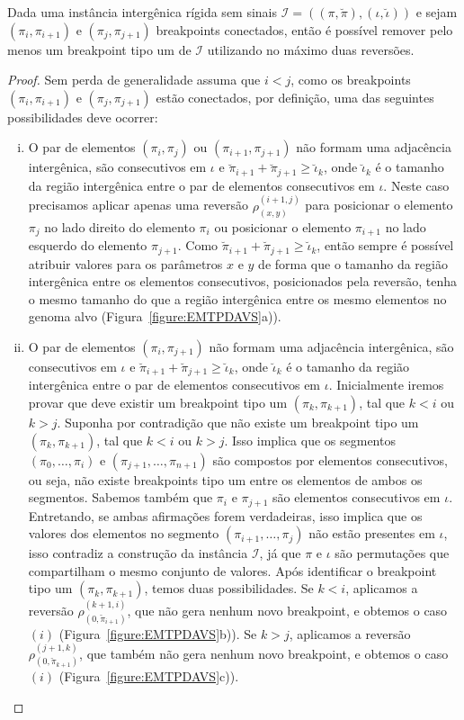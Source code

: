\begin{lemma}\label{lemma:IMYFBWDY}
Dada uma instância intergênica rígida sem sinais $\mathcal{I}=((\pi,\breve\pi),(\iota,\breve\iota))$ e sejam $(\pi_i,\pi_{i+1})$ e $(\pi_j,\pi_{j+1})$ breakpoints conectados, então é possível remover pelo menos um breakpoint tipo um de $\mathcal{I}$ utilizando no máximo duas reversões.
\end{lemma}
\begin{proof}
Sem perda de generalidade assuma que $i < j$, como os breakpoints $(\pi_i,\pi_{i+1})$ e $(\pi_j,\pi_{j+1})$ estão conectados, por definição, uma das seguintes possibilidades deve ocorrer:
\begin{enumerate}[i.]
    \item O par de elementos $(\pi_i,\pi_{j})$ ou $(\pi_{i+1},\pi_{j+1})$ não formam uma adjacência intergênica, são consecutivos em $\iota$ e $\breve\pi_{i+1} + \breve\pi_{j+1} \ge \breve\iota_k$, onde $\breve\iota_k$ é o tamanho da região intergênica entre o par de elementos consecutivos em $\iota$. Neste caso precisamos aplicar apenas uma reversão $\rho^{(i+1,j)}_{(x,y)}$ para posicionar o elemento $\pi_{j}$ no lado direito do elemento $\pi_{i}$ ou posicionar o elemento $\pi_{i+1}$ no lado esquerdo do elemento $\pi_{j+1}$. Como $\breve\pi_{i+1} + \breve\pi_{j+1} \ge \breve\iota_k$, então sempre é possível atribuir valores para os parâmetros $x$ e $y$ de forma que o tamanho da região intergênica entre os elementos consecutivos, posicionados pela reversão, tenha o mesmo tamanho do que a região intergênica entre os mesmo elementos no genoma alvo (Figura~\ref{figure:EMTPDAVS}a)).  
    \item O par  de elementos $(\pi_i,\pi_{j+1})$ não formam uma adjacência intergênica, são consecutivos em $\iota$ e $\breve\pi_{i+1} + \breve\pi_{j+1} \ge \breve\iota_k$, onde $\breve\iota_k$ é o tamanho da região intergênica entre o par de elementos consecutivos em $\iota$. Inicialmente iremos provar que deve existir um breakpoint tipo um $(\pi_k,\pi_{k+1})$, tal que $k < i$ ou $k > j$. Suponha por contradição que não existe um breakpoint tipo um $(\pi_k,\pi_{k+1})$, tal que $k < i$ ou $k > j$. Isso implica que os segmentos $(\pi_0,\dots,\pi_i)$ e $(\pi_{j+1},\dots,\pi_{n+1})$ são compostos por elementos consecutivos, ou seja, não existe breakpoints tipo um entre os elementos de ambos os segmentos. Sabemos também que $\pi_i$ e $\pi_{j+1}$ são elementos consecutivos em $\iota$. Entretando, se ambas afirmações forem verdadeiras, isso implica que os valores dos elementos no segmento $(\pi_{i+1},\dots,\pi_j)$ não estão presentes em $\iota$, isso contradiz a construção da instância $\mathcal{I}$, já que $\pi$ e $\iota$ são permutações que compartilham o mesmo conjunto de valores. Após identificar o breakpoint tipo um $(\pi_k,\pi_{k+1})$, temos duas possibilidades. Se $k < i$, aplicamos a reversão $\rho^{(k+1,i)}_{(0,\breve\pi_{i+1})}$, que não gera nenhum novo breakpoint, e obtemos o caso $(i)$ (Figura~\ref{figure:EMTPDAVS}b)). Se $k > j$, aplicamos a reversão $\rho^{(j+1,k)}_{(0,\breve\pi_{k+1})}$, que também não gera nenhum novo breakpoint, e obtemos o caso $(i)$ (Figura~\ref{figure:EMTPDAVS}c)).

\end{enumerate}
\end{proof}
